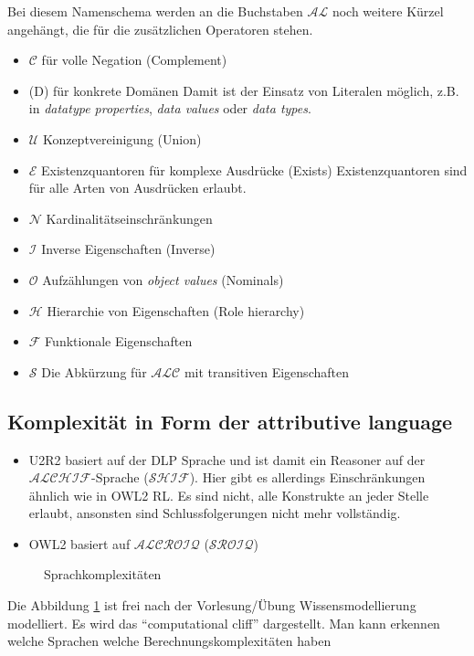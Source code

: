 Bei diesem Namenschema werden an die Buchstaben $\mathcal{AL}$ noch weitere Kürzel angehängt, die für die zusätzlichen Operatoren stehen.
\begin{itemize}
  \item $\mathcal{C}$ für volle Negation (Complement)
  \item (D) für konkrete Domänen\newline
Damit ist der Einsatz von Literalen möglich, z.B. in \emph{datatype properties}, \emph{data values} oder \emph{data types}.
  \item $\mathcal{U}$ Konzeptvereinigung (Union)
  \item $\mathcal{E}$ Existenzquantoren für komplexe Ausdrücke (Exists)\newline
Existenzquantoren sind für alle Arten von Ausdrücken erlaubt.
  \item $\mathcal{N}$ Kardinalitätseinschränkungen
  \item $\mathcal{I}$ Inverse Eigenschaften (Inverse)
  \item $\mathcal{O}$ Aufzählungen von \emph{object values} (Nominals)
  \item $\mathcal{H}$ Hierarchie von Eigenschaften (Role hierarchy)
  \item $\mathcal{F}$ Funktionale Eigenschaften
  \item $\mathcal{S}$ Die Abkürzung für $\mathcal{ALC}$ mit transitiven Eigenschaften
\end{itemize}
\cite{wiki:DescriptionLogic}

\subsection{Komplexität in Form der attributive language}
\begin{itemize}
  \item U2R2 basiert auf der DLP Sprache und ist damit ein Reasoner auf der $\mathcal{ALCHIF}$-Sprache ($\mathcal{SHIF}$). Hier gibt es allerdings Einschränkungen ähnlich wie in OWL2 RL. Es sind nicht, alle Konstrukte an jeder Stelle erlaubt, ansonsten sind Schlussfolgerungen nicht mehr vollständig.
  \item OWL2 basiert auf $\mathcal{ALCROIQ}$ ($\mathcal{SROIQ}$) \cite{Krötzsch2008}
\end{itemize}


\begin{figure}[htb]
	\caption{Sprachkomplexitäten}
	\label{image-sprachkomplexitaeten}
	\begin{center}
	\end{center}
\end{figure}
Die Abbildung \ref{image-sprachkomplexitaeten} ist frei nach der Vorlesung/Übung Wissensmodellierung \cite{vonHenke2009} modelliert. Es wird das ``computational cliff'' dargestellt. Man kann erkennen welche Sprachen welche Berechnungskomplexitäten haben

